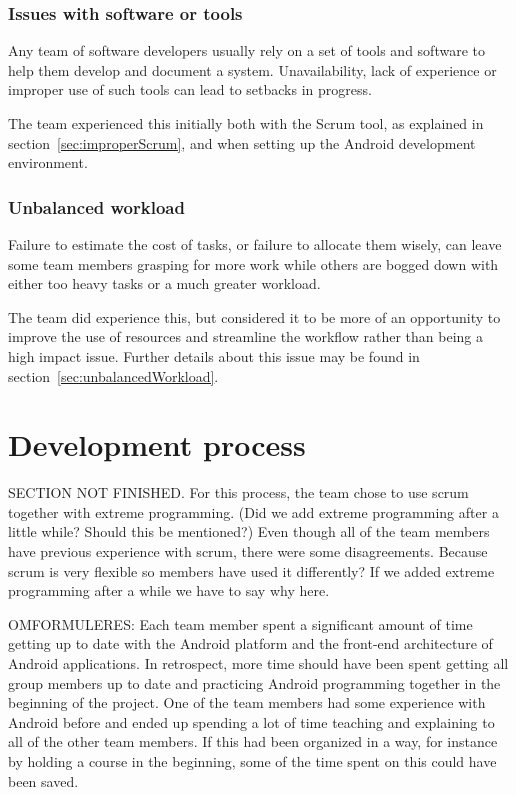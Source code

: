 \subsubsection{Issues with software or tools}
Any team of software developers usually rely on a set of tools and software to help them develop and document a system. Unavailability, lack of experience or improper use of such tools can lead to setbacks in progress.

The team experienced this initially both with the Scrum tool, as explained in section~\ref{sec:improperScrum}, and when setting up the Android development environment.

\subsubsection{Unbalanced workload}
Failure to estimate the cost of tasks, or failure to allocate them wisely, can leave some team members grasping for more work while others are bogged down with either too heavy tasks or a much greater workload.

The team did experience this, but considered it to be more of an opportunity to improve the use of resources and streamline the workflow rather than being a high impact issue. Further details about this issue may be found in section~\ref{sec:unbalancedWorkload}.


\section{Development process}
SECTION NOT FINISHED. For this process, the team chose to use scrum together with extreme programming. (Did we add extreme programming after a little while? Should this be mentioned?) Even though all of the team members have previous experience with scrum, there were some disagreements. Because scrum is very flexible so members have used it differently? If we added extreme programming after a while we have to say why here. 

OMFORMULERES: Each team member spent a significant amount of time getting up to date with the Android platform and the front-end architecture of Android applications. In retrospect, more time should have been spent getting all group members up to date and practicing Android programming together in the beginning of the project. One of the team members had some experience with Android before and ended up spending a lot of time teaching and explaining to all of the other team members. If this had been organized in a way, for instance by holding a course in the beginning, some of the time spent on this could have been saved. 

